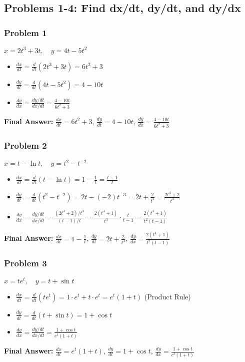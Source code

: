 \documentclass{article}
\begin{document}
\subsection{Problems 1-4: Find dx/dt, dy/dt, and dy/dx}

\subsubsection{Problem 1}
$x = 2t^3 + 3t, \quad y = 4t - 5t^2$
\begin{itemize}
    \item $\frac{dx}{dt} = \frac{d}{dt}(2t^3 + 3t) = 6t^2 + 3$
    \item $\frac{dy}{dt} = \frac{d}{dt}(4t - 5t^2) = 4 - 10t$
    \item $\frac{dy}{dx} = \frac{dy/dt}{dx/dt} = \frac{4 - 10t}{6t^2 + 3}$
\end{itemize}
\textbf{Final Answer:} $\frac{dx}{dt} = 6t^2 + 3$, $\frac{dy}{dt} = 4 - 10t$, $\frac{dy}{dx} = \frac{4 - 10t}{6t^2 + 3}$

\subsubsection{Problem 2}
$x = t - \ln t, \quad y = t^2 - t^{-2}$
\begin{itemize}
    \item $\frac{dx}{dt} = \frac{d}{dt}(t - \ln t) = 1 - \frac{1}{t} = \frac{t-1}{t}$
    \item $\frac{dy}{dt} = \frac{d}{dt}(t^2 - t^{-2}) = 2t - (-2)t^{-3} = 2t + \frac{2}{t^3} = \frac{2t^4 + 2}{t^3}$
    \item $\frac{dy}{dx} = \frac{dy/dt}{dx/dt} = \frac{(2t^4 + 2)/t^3}{(t-1)/t} = \frac{2(t^4+1)}{t^3} \cdot \frac{t}{t-1} = \frac{2(t^4+1)}{t^2(t-1)}$
\end{itemize}
\textbf{Final Answer:} $\frac{dx}{dt} = 1 - \frac{1}{t}$, $\frac{dy}{dt} = 2t + \frac{2}{t^3}$, $\frac{dy}{dx} = \frac{2(t^4+1)}{t^2(t-1)}$

\subsubsection{Problem 3}
$x = te^t, \quad y = t + \sin t$
\begin{itemize}
    \item $\frac{dx}{dt} = \frac{d}{dt}(te^t) = 1 \cdot e^t + t \cdot e^t = e^t(1+t)$ (Product Rule)
    \item $\frac{dy}{dt} = \frac{d}{dt}(t + \sin t) = 1 + \cos t$
    \item $\frac{dy}{dx} = \frac{dy/dt}{dx/dt} = \frac{1 + \cos t}{e^t(1+t)}$
\end{itemize}
\textbf{Final Answer:} $\frac{dx}{dt} = e^t(1+t)$, $\frac{dy}{dt} = 1 + \cos t$, $\frac{dy}{dx} = \frac{1 + \cos t}{e^t(1+t)}$
\end{document}
